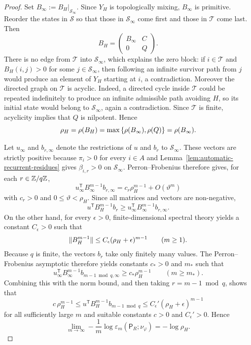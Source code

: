 \begin{proof}
Set \(B_\infty:=B_H|_{\mathcal S_\infty}\).  Since \(Y_H\) is
topologically mixing, \(B_\infty\) is primitive.  Reorder the states in
\(\mathcal S\) so that those in \(\mathcal S_\infty\) come first and
those in \(\mathcal T\) come last.  Then
\[
  B_H=
  \begin{pmatrix}
    B_\infty & C\\
    0 & Q
  \end{pmatrix}.
\]
There is no edge from \(\mathcal T\) into \(\mathcal S_\infty\), which
explains the zero block: if \(i\in\mathcal T\) and \(B_H(i,j)>0\) for
some \(j\in\mathcal S_\infty\), then following an infinite survivor path
from \(j\) would produce an element of \(Y_H\) starting at \(i\), a
contradiction.  Moreover the directed graph on \(\mathcal T\) is
acyclic.  Indeed, a directed cycle inside \(\mathcal T\) could be
repeated indefinitely to produce an infinite admissible path avoiding
\(H\), so its initial state would belong to \(\mathcal S_\infty\), again
a contradiction.  Since \(\mathcal T\) is finite, acyclicity implies
that \(Q\) is nilpotent.  Hence
\[
  \rho_H=\rho(B_H)=\max\left\{\rho(B_\infty),\rho(Q)\right\}=\rho(B_\infty).
\]

Let \(u_\infty\) and \(b_{r,\infty}\) denote the restrictions of \(u\)
and \(b_r\) to \(\mathcal S_\infty\).  These vectors are strictly
positive because \(\pi_i>0\) for every \(i\in A\) and
Lemma~\ref{lem:automatic-recurrent-residues} gives
\(\beta_{i,r}>0\) on \(\mathcal S_\infty\).  Perron--Frobenius therefore gives, for each
\(r\in\mathbb{Z}/q\mathbb{Z}\),
\[
  u_\infty^{\mathsf T}B_\infty^{m-1}b_{r,\infty}
  = c_r\rho_H^{m-1}+O(\vartheta^m)
\]
with \(c_r>0\) and \(0\leq \vartheta<\rho_H\).  Since all matrices and
vectors are non-negative,
\[
  u^{\mathsf T}B_H^{m-1}b_r
  \geq
  u_\infty^{\mathsf T}B_\infty^{m-1}b_{r,\infty}.
\]
On the other hand, for every \(\epsilon>0\), finite-dimensional spectral
theory yields a constant \(C_\epsilon>0\) such that
\[
  \lVert B_H^{m-1}\rVert\leq C_\epsilon(\rho_H+\epsilon)^{m-1}
  \qquad (m\geq 1).
\]
Because \(q\) is finite, the vectors \(b_r\) take only finitely many
values.  The Perron--Frobenius asymptotic therefore yields constants
\(c_\ast>0\) and \(m_\ast\) such that
\[
  u_\infty^{\mathsf T}B_\infty^{m-1}b_{m-1\bmod q,\infty}
  \geq c_\ast\rho_H^{m-1}
  \qquad (m\geq m_\ast).
\]
Combining this with the norm bound, and then taking \(r=m-1\bmod q\),
shows that
\[
  c\,\rho_H^{m-1}
  \leq u^{\mathsf T}B_H^{m-1}b_{m-1\bmod q}
  \leq C_\epsilon'(\rho_H+\epsilon)^{m-1}
\]
for all sufficiently large \(m\) and suitable constants
\(c>0\) and \(C_\epsilon'>0\).  Hence
\[
  \lim_{m\to\infty}
  -\frac1m\log\varepsilon_m(\mathsf{P}_R;\nu_\varphi)
  = -\log\rho_H.
\]


\end{proof}
